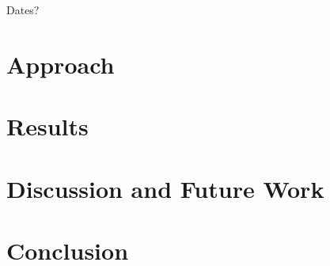 \documentclass[12pt]{article}
\begin{document}
Dates?

\section{Approach}

\section{Results}

\section{Discussion and Future Work}

\section{Conclusion}
\end{document}
